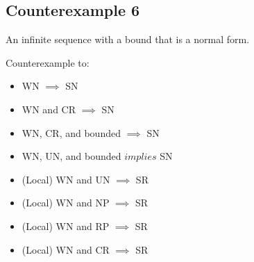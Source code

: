 \documentclass{scrartcl}
\begin{document}
\subsection*{Counterexample 6}
An infinite sequence with a bound that is a normal form.
\begin{center}



    \end{center}
Counterexample to:
\begin{itemize}
  \item WN $\implies$ SN
  \item WN and CR $\implies$ SN
  \item WN, CR, and bounded $\implies$ SN
  \item WN, UN, and bounded $implies$ SN
  \item (Local) WN and UN $\implies$ SR
  \item (Local) WN and NP $\implies$ SR
  \item (Local) WN and RP $\implies$ SR
  \item (Local) WN and CR $\implies$ SR
\end{itemize}
\end{document}
